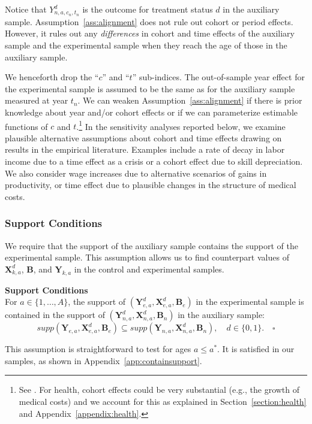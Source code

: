 Notice that $Y^d_{n,a,{c_n},{t_n}}$ is the outcome for treatment status $d$ in the auxiliary sample. Assumption~\ref{ass:alignment} does not rule out cohort or period effects. However, it rules out any \emph{differences} in cohort and time effects of the auxiliary sample and the experimental sample when they reach the age of those in the auxiliary sample.

We henceforth drop the ``$c$'' and ``$t$'' sub-indices. The out-of-sample year effect for the experimental sample is assumed to be the same as for the auxiliary sample measured at year $t_n$. We can weaken Assumption~\ref{ass:alignment} if there is prior knowledge about year and/or cohort effects or if we can parameterize estimable functions of $c$ and $t$.\footnote{See \cite{Heckman_Robb_1985_JE}. For health, cohort effects could be very substantial (e.g., the growth of medical costs) and we account for this as explained in Section~\ref{section:health} and  Appendix~\ref{appendix:health}.} In the sensitivity analyses reported below, we examine plausible alternative assumptions about cohort and time effects drawing on results in the empirical literature. Examples include a rate of decay in labor income due to a time effect as a crisis or a cohort effect due to skill depreciation. We also consider wage increases due to alternative scenarios of gains in productivity, or time effect due to plausible changes in the structure of medical costs.

\subsubsection{Support Conditions}

We require that the support of the auxiliary sample contains the support of the experimental sample. This assumption allows us to find counterpart values of $\bm{X}^d_{k,a}$, $\bm{B}$, and $\bm{Y}_{k,a}$ in the control and experimental samples.

\onehalfspacing
\begin{assumption} \label{ass:contain} \textbf{Support Conditions} \\
For $a \in \{ 1, \ldots, A \}$, the support of $\left( \bm{Y}^d_{e,a}, \bm{X}^d_{e,a}, \bm{B}_e \right)$ in the experimental sample is contained in the support of $\left( \bm{Y}^d_{n,a}, \bm{X}^d_{n,a}, \bm{B}_n \right)$ in the auxiliary sample:
\begin{equation}
supp( \bm{Y}_{e,a}, \bm{X}^d_{e,a}, \bm{B}_e ) \subseteq supp( \bm{Y}_{n,a}, \bm{X}^d_{n,a}, \bm{B}_n ), \quad d \in \{0,1\}. \quad \square
\end{equation}
\end{assumption}
\doublespacing
This assumption is straightforward to test for ages $a\leq a^\ast$. It is satisfied in our samples, as shown in Appendix~\ref{app:containsupport}.

